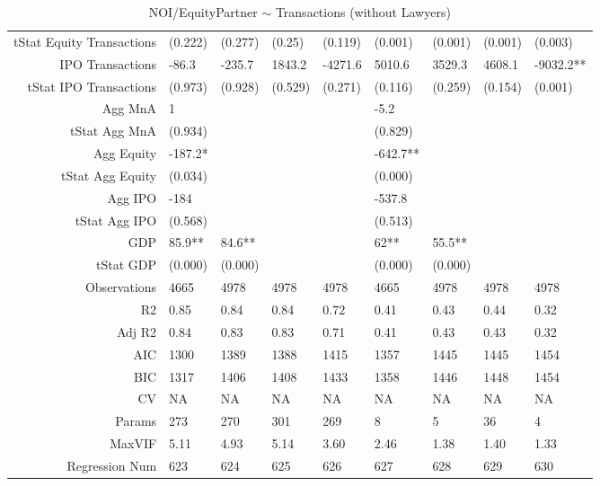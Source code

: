 \begin{table}[ht]
\begin{tabular}{rllllllll}
  tStat Equity Transactions & (0.222) & (0.277) & (0.25) & (0.119) & (0.001) & (0.001) & (0.001) & (0.003) \\ 
  IPO Transactions & -86.3 & -235.7 & 1843.2 & -4271.6 & 5010.6 & 3529.3 & 4608.1 & -9032.2** \\ 
  tStat IPO Transactions & (0.973) & (0.928) & (0.529) & (0.271) & (0.116) & (0.259) & (0.154) & (0.001) \\ 
  Agg MnA & 1 &  &  &  & -5.2 &  &  &  \\ 
  tStat Agg MnA & (0.934) &  &  &  & (0.829) &  &  &  \\ 
  Agg Equity & -187.2* &  &  &  & -642.7** &  &  &  \\ 
  tStat Agg Equity & (0.034) &  &  &  & (0.000) &  &  &  \\ 
  Agg IPO & -184 &  &  &  & -537.8 &  &  &  \\ 
  tStat Agg IPO & (0.568) &  &  &  & (0.513) &  &  &  \\ 
  GDP & 85.9** & 84.6** &  &  & 62** & 55.5** &  &  \\ 
  tStat GDP & (0.000) & (0.000) &  &  & (0.000) & (0.000) &  &  \\ 
  Observations & 4665 & 4978 & 4978 & 4978 & 4665 & 4978 & 4978 & 4978 \\ 
  R2 & 0.85 & 0.84 & 0.84 & 0.72 & 0.41 & 0.43 & 0.44 & 0.32 \\ 
  Adj R2 & 0.84 & 0.83 & 0.83 & 0.71 & 0.41 & 0.43 & 0.43 & 0.32 \\ 
  AIC & 1300 & 1389 & 1388 & 1415 & 1357 & 1445 & 1445 & 1454 \\ 
  BIC & 1317 & 1406 & 1408 & 1433 & 1358 & 1446 & 1448 & 1454 \\ 
  CV & NA & NA & NA & NA & NA & NA & NA & NA \\ 
  Params & 273 & 270 & 301 & 269 & 8 & 5 & 36 & 4 \\ 
  MaxVIF & 5.11 & 4.93 & 5.14 & 3.60 & 2.46 & 1.38 & 1.40 & 1.33 \\ 
  Regression Num & 623 & 624 & 625 & 626 & 627 & 628 & 629 & 630 \\ 
   \hline
\end{tabular}
\caption{NOI/EquityPartner $\sim$ Transactions (without Lawyers)} 
\end{table}

